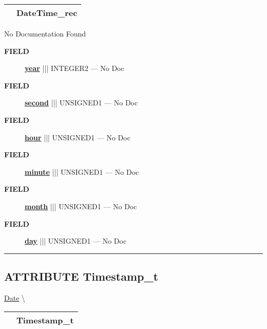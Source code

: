 {\renewcommand{\arraystretch}{1.5}
\begin{tabularx}{\textwidth}{|>{\raggedright\arraybackslash}l|X|}
\hline
\hspace{0pt}\mytexttt{\color{red} } & \textbf{DateTime\_rec} \\
\hline
\end{tabularx}
}

\par





No Documentation Found







\par
\begin{description}
\item [\colorbox{tagtype}{\color{white} \textbf{\textsf{FIELD}}}] \textbf{\underline{year}} ||| INTEGER2 --- No Doc
\item [\colorbox{tagtype}{\color{white} \textbf{\textsf{FIELD}}}] \textbf{\underline{second}} ||| UNSIGNED1 --- No Doc
\item [\colorbox{tagtype}{\color{white} \textbf{\textsf{FIELD}}}] \textbf{\underline{hour}} ||| UNSIGNED1 --- No Doc
\item [\colorbox{tagtype}{\color{white} \textbf{\textsf{FIELD}}}] \textbf{\underline{minute}} ||| UNSIGNED1 --- No Doc
\item [\colorbox{tagtype}{\color{white} \textbf{\textsf{FIELD}}}] \textbf{\underline{month}} ||| UNSIGNED1 --- No Doc
\item [\colorbox{tagtype}{\color{white} \textbf{\textsf{FIELD}}}] \textbf{\underline{day}} ||| UNSIGNED1 --- No Doc
\end{description}





\rule{\linewidth}{0.5pt}
\subsection*{\textsf{\colorbox{headtoc}{\color{white} ATTRIBUTE}
Timestamp\_t}}

\hypertarget{ecldoc:date.timestamp_t}{}
\hspace{0pt} \hyperlink{ecldoc:Date}{Date} \textbackslash 

{\renewcommand{\arraystretch}{1.5}
\begin{tabularx}{\textwidth}{|>{\raggedright\arraybackslash}l|X|}
\hline
\hspace{0pt}\mytexttt{\color{red} } & \textbf{Timestamp\_t} \\
\hline
\end{tabularx}
}

